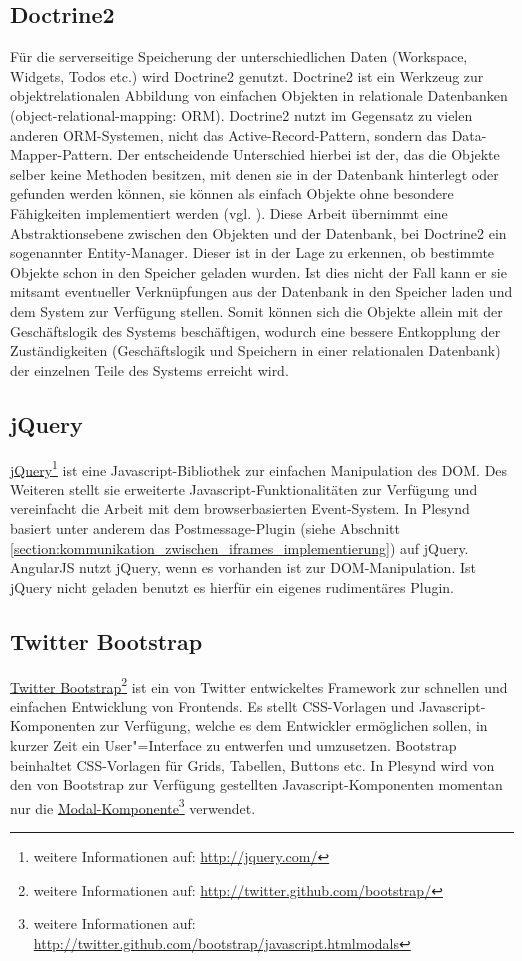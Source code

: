 \subsection{Doctrine2}\label{section:doctrine2}
Für die serverseitige Speicherung der unterschiedlichen Daten (Workspace, Widgets, Todos etc.) wird Doctrine2 genutzt. Doctrine2 ist ein Werkzeug zur objektrelationalen Abbildung von einfachen Objekten in relationale Datenbanken (object-relational-mapping: ORM). Doctrine2 nutzt im Gegensatz zu vielen anderen ORM-Systemen, nicht das Active-Record-Pattern, sondern das Data-Mapper-Pattern. Der entscheidende Unterschied hierbei ist der, das die Objekte selber keine Methoden besitzen, mit denen sie in der Datenbank hinterlegt oder gefunden werden können, sie können als einfach Objekte ohne besondere Fähigkeiten implementiert werden (vgl. \cite{Fowler2002}). Diese Arbeit übernimmt eine Abstraktionsebene zwischen den Objekten und der Datenbank, bei Doctrine2 ein sogenannter Entity-Manager. Dieser ist in der Lage zu erkennen, ob bestimmte Objekte schon in den Speicher geladen wurden. Ist dies nicht der Fall kann er sie mitsamt eventueller Verknüpfungen aus der Datenbank in den Speicher laden und dem System zur Verfügung stellen. Somit können sich die Objekte allein mit der Geschäftslogik des Systems beschäftigen, wodurch eine bessere Entkopplung der Zuständigkeiten (Geschäftslogik und Speichern in einer relationalen Datenbank) der einzelnen Teile des Systems erreicht wird.

\subsection{jQuery}
\href{http://jquery.com/}{jQuery}\footnote{weitere Informationen auf: \url{http://jquery.com/}} ist eine Javascript-Bibliothek zur einfachen Manipulation des DOM. Des Weiteren stellt sie erweiterte Javascript-Funktionalitäten zur Verfügung und vereinfacht die Arbeit mit dem browserbasierten Event-System. In Plesynd basiert unter anderem das Postmessage-Plugin (siehe Abschnitt \ref{section:kommunikation_zwischen_iframes_implementierung}) auf jQuery. AngularJS nutzt jQuery, wenn es vorhanden ist zur DOM-Manipulation. Ist jQuery nicht geladen benutzt es hierfür ein eigenes rudimentäres Plugin.

\subsection{Twitter Bootstrap}
\href{http://twitter.github.com/bootstrap/}{Twitter Bootstrap}\footnote{weitere Informationen auf: \url{http://twitter.github.com/bootstrap/}} ist ein von Twitter entwickeltes Framework zur schnellen und einfachen Entwicklung von Frontends. Es stellt CSS-Vorlagen und Javascript-Komponenten zur Verfügung, welche es dem Entwickler ermöglichen sollen, in kurzer Zeit ein User"=Interface zu entwerfen und umzusetzen. Bootstrap beinhaltet CSS-Vorlagen für Grids, Tabellen, Buttons etc. In Plesynd wird von den von Bootstrap zur Verfügung gestellten Javascript-Komponenten momentan nur die \href{http://twitter.github.com/bootstrap/javascript.htmlmodals}{Modal-Komponente}\footnote{weitere Informationen auf: \url{http://twitter.github.com/bootstrap/javascript.htmlmodals}} verwendet. 

